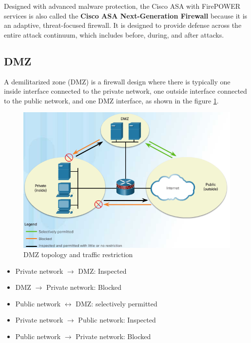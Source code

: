 Designed with advanced malware protection, the Cisco ASA with FirePOWER services is also called the \textbf{Cisco ASA Next-Generation Firewall} because it is an adaptive, threat-focused firewall. It is designed to provide defense across the entire attack continuum, which includes before, during, and after attacks.

\subsection{DMZ}

A demilitarized zone (DMZ) is a firewall design where there is typically one inside interface connected to the private network, one outside interface connected to the public network, and one DMZ interface, as shown in the figure \ref{DMZfilter}.

\begin{figure}[hbtp]
\caption{DMZ topology and traffic restriction}\label{DMZfilter}
\centering
\includegraphics[width=10\xm]{pictures/DMZfilter.PNG}
\end{figure}

\begin{itemize}
\item Private network $\rightarrow$ DMZ: Inspected 
\item DMZ  $\rightarrow$ Private network: Blocked
\item Public network  $\leftrightarrow$ DMZ: selectively permitted
\item Private network $\rightarrow$ Public network: Inspected
\item Public network $\rightarrow$ Private network: Blocked
\end{itemize}

